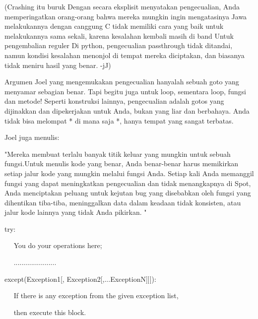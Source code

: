 \vspace{12pt}
 
(Crashing itu buruk Dengan secara eksplisit menyatakan pengecualian, Anda memperingatkan orang-orang bahwa mereka mungkin ingin mengatasinya Jawa melakukannya dengan canggung C tidak memiliki cara yang baik untuk melakukannya sama sekali, karena kesalahan kembali masih di band Untuk pengembalian reguler Di python, pengecualian passthrough tidak ditandai, namun kondisi kesalahan menonjol di tempat mereka diciptakan, dan biasanya tidak meniru hasil yang benar. -jJ)

 \hspace*{0.64in} Argumen Joel yang mengemukakan pengecualian hanyalah sebuah goto yang menyamar sebagian benar. Tapi begitu juga untuk loop, sementara loop, fungsi dan metode! Seperti konstruksi lainnya, pengecualian adalah gotos yang dijinakkan dan dipekerjakan untuk Anda, bukan yang liar dan berbahaya. Anda tidak bisa melompat * di mana saja *, hanya tempat yang sangat terbatas. 
 
\vspace{12pt}

Joel juga menulis: 

\vspace{12pt}
 
 \hspace*{0.64in} "Mereka membuat terlalu banyak titik keluar yang mungkin untuk sebuah fungsi.Untuk menulis kode yang benar, Anda benar-benar harus memikirkan setiap jalur kode yang mungkin melalui fungsi Anda. Setiap kali Anda memanggil fungsi yang dapat meningkatkan pengecualian dan tidak menangkapnya di Spot, Anda menciptakan peluang untuk kejutan bug yang disebabkan oleh fungsi yang dihentikan tiba-tiba, meninggalkan data dalam keadaan tidak konsisten, atau jalur kode lainnya yang tidak Anda pikirkan. " 
 
\vspace{12pt}
 
\vspace{10pt}
\vspace{12pt}

try: 
 
~~ You do your operations here; 

~~ ...................... 
 
except(Exception1[, Exception2[,...ExceptionN]]]): 
 
~~ If there is any exception from the given exception list,  

~~ then execute this block. 

